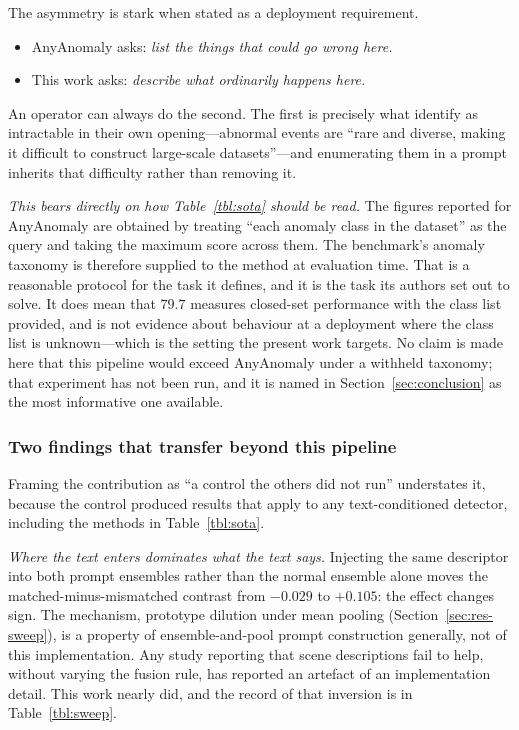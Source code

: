 \documentclass[a4paper,fleqn]{cas-sc}
\begin{document}
The asymmetry is stark when stated as a deployment requirement.
\begin{itemize}
  \item AnyAnomaly asks: \emph{list the things that could go wrong here.}
  \item This work asks: \emph{describe what ordinarily happens here.}
\end{itemize}
An operator can always do the second. The first is precisely what
\citet{anyanomaly2025} identify as intractable in their own opening---abnormal
events are ``rare and diverse, making it difficult to construct large-scale
datasets''---and enumerating them in a prompt inherits that difficulty rather
than removing it.

\emph{This bears directly on how Table~\ref{tbl:sota} should be read.} The
figures reported for AnyAnomaly are obtained by treating ``each anomaly class in
the dataset'' as the query and taking the maximum score across them. The
benchmark's anomaly taxonomy is therefore supplied to the method at evaluation
time. That is a reasonable protocol for the task it defines, and it is the task
its authors set out to solve. It does mean that $79.7$ measures closed-set
performance with the class list provided, and is not evidence about behaviour at
a deployment where the class list is unknown---which is the setting the present
work targets. No claim is made here that this pipeline would exceed AnyAnomaly
under a withheld taxonomy; that experiment has not been run, and it is named in
Section~\ref{sec:conclusion} as the most informative one available.

\subsubsection{Two findings that transfer beyond this pipeline}
Framing the contribution as ``a control the others did not run'' understates it,
because the control produced results that apply to any text-conditioned
detector, including the methods in Table~\ref{tbl:sota}.

\emph{Where the text enters dominates what the text says.} Injecting the same
descriptor into both prompt ensembles rather than the normal ensemble alone
moves the matched-minus-mismatched contrast from $-0.029$ to $+0.105$: the
effect changes sign. The mechanism, prototype dilution under mean pooling
(Section~\ref{sec:res-sweep}), is a property of ensemble-and-pool prompt
construction generally, not of this implementation. Any study reporting that
scene descriptions fail to help, without varying the fusion rule, has reported
an artefact of an implementation detail. This work nearly did, and the record of
that inversion is in Table~\ref{tbl:sweep}.
\end{document}
